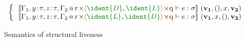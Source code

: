 \begin{figure}[t]
\begin{equation*}
\begin{array}{l}
\begin{cases}
~~\sem{\coctx{\Gamma_1,y\!:\!\tau,z\!:\!\tau,\Gamma_2}{\aclrd{\textbf{r}} \cons \alift{\cclrd{\ident{D}},\cclrd{\ident{L}}} \cons \aclrd{\textbf{q}}} \vdash e : \sigma}~(\mathbf{v_1}, (), x, \mathbf{v_2})\\[-0.25em]
~~\sem{\coctx{\Gamma_1,y\!:\!\tau,z\!:\!\tau,\Gamma_2}{\aclrd{\textbf{r}} \cons \alift{\cclrd{\ident{L}},\cclrd{\ident{D}}} \cons \aclrd{\textbf{q}}} \vdash e : \sigma}~(\mathbf{v_1}, x, (), \mathbf{v_2})
\end{cases}
\end{array}
\end{equation*}
\vspace{-0.5em}
\caption{Semantics of structural liveness}
\label{fig:applications-struct-livesem}
\end{figure}
\vspace{-0.5em}


